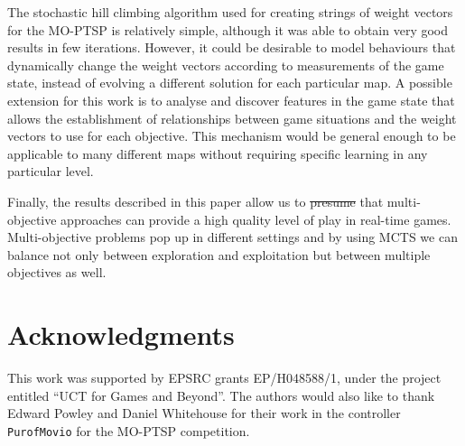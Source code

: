\documentclass[journal]{IEEEtran}
\providecommand{\DIFaddtex}[1]{{\protect\color{blue}\uwave{#1}}} %
\providecommand{\DIFdeltex}[1]{{\protect\color{red}\sout{#1}}}                      %
\providecommand{\DIFaddbegin}{} %
\providecommand{\DIFaddend}{} %
\providecommand{\DIFdelbegin}{} %
\providecommand{\DIFdelend}{} %
\providecommand{\DIFadd}[1]{\texorpdfstring{\DIFaddtex{#1}}{#1}} %
\providecommand{\DIFdel}[1]{\texorpdfstring{\DIFdeltex{#1}}{}} %
\begin{document}
The stochastic hill climbing algorithm used for creating strings of weight vectors for the MO-PTSP is relatively simple, although it was able to obtain very good results in few iterations. However, it could be desirable to model behaviours that dynamically change the weight vectors according to measurements of the game state, instead of evolving a different solution for each particular map. A possible extension for this work is to analyse and discover features in the game state that allows the establishment of relationships between game situations and the weight vectors to use for each objective. This mechanism would be general enough to be applicable to many different maps without requiring specific learning in any particular level.

Finally, the results described in this paper allow us to \DIFdelbegin \DIFdel{presume }\DIFdelend \DIFaddbegin \DIFadd{assume }\DIFaddend that multi-objective approaches can provide a high quality level of play in real-time games. Multi-objective problems pop up in different settings and by using MCTS we can balance not only between exploration and exploitation but between multiple objectives as well. 

\section*{Acknowledgments}
This work was supported by EPSRC grants EP/H048588/1, under the project entitled ``UCT for Games and Beyond''. The authors would also like to thank Edward Powley and Daniel Whitehouse for their work in the controller \texttt{PurofMovio} for the MO-PTSP competition.


\ifCLASSOPTIONcaptionsoff
  \newpage
\fi





%
%
%
\end{document}
